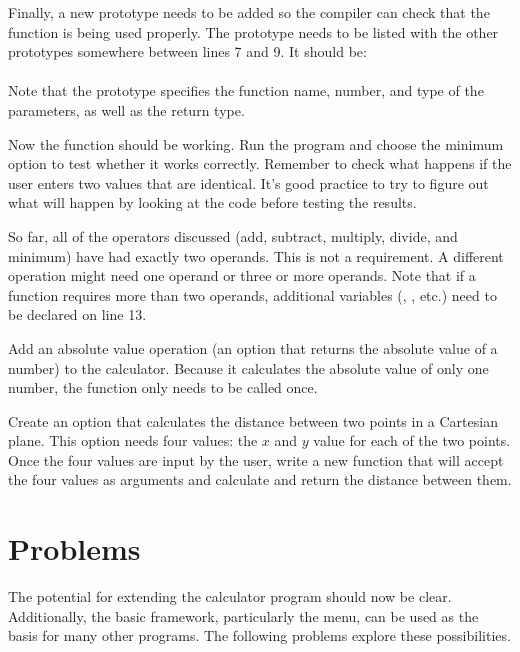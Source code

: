 Finally, a new prototype needs to be added so the compiler can check that the function is being used properly.  The prototype needs to be listed with the other prototypes somewhere between lines 7 and 9.  It should be:\\
\\
Note that the prototype specifies the function name, number, and type of the parameters, as well as the return type.  

Now the  function should be working. Run the program and choose the minimum option to test whether it works correctly.  Remember to check what happens if the user enters two values that are identical.  It's good practice to try to figure out what will happen by looking at the code before testing the results.


So far, all of the operators discussed (add, subtract, multiply, divide, and minimum) have had exactly two operands.  This is not a requirement.  A different operation might need one operand or three or more operands.  Note  that if a function requires more than two operands, additional variables (, , etc.) need to be declared on line 13.

Add an absolute value operation (an option that returns the absolute value of a number) to the calculator.  Because it calculates the absolute value of only one number, the  function only needs to be called once.  


Create an option that calculates the distance between two points in a Cartesian plane.  This option needs four values: the $x$ and $y$ value for each of the two points.  Once the four values are input by the user, write a new function that will accept the four values as arguments and calculate and return the distance between them.


\section{Problems}

The potential for extending the calculator program should now be clear.  Additionally, the basic framework, particularly the menu, can be used as the basis for many other programs.  The following problems explore these possibilities.

